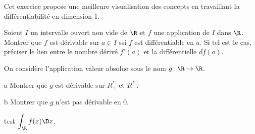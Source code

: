 \documentclass{report}
\begin{document}
\begin{exo}
    Cet exercice propose une meilleure visualisation des concepts en travaillant
    la différentiabilité en dimension 1.
    \begin{q}{1}
        Soient \(I\) un intervalle ouvert non vide de \(\R\) et \(f\) une application
        de \(I\) dans \(\R\). Montrer que \(f\) est dérivable sur \(a\in I\) ssi
        \(f\) est différentiable en \(a\). Si tel est le cas, préciser le lien entre
        le nombre dérivé \(f'(a)\) et la différentielle \(df(a)\).
    \end{q}
    \begin{q}{2}
        On considère l'application valeur absolue sous le nom \(g\colon\R\to\R\).
        \begin{q}{a}
            Montrer que \(g\) est dérivable sur \(R_+^*\) et \(R_-^*\).
        \end{q}
        \begin{q}{b}
            Montrer que \(g\) n'est pas dérivable en \(0\).
        \end{q}
    \end{q}
\end{exo}

test \(\displaystyle\int_\R f(x)\D x\).
\end{document}
